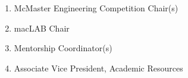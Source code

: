 \begin{enumerate}
  \begin{enumerate}
   \item
    McMaster Engineering Competition Chair(s)
   \item
    macLAB Chair
   \item
    Mentorship Coordinator(s)
   \item
    Associate Vice President, Academic Resources

  \end{enumerate}
\end{enumerate}